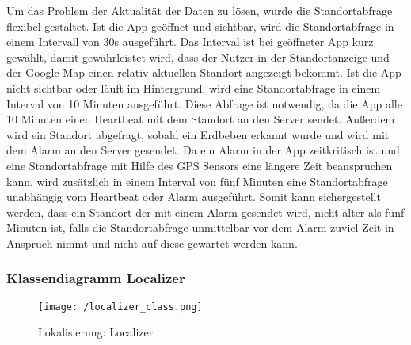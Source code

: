 \par\bigskip
Um das Problem der Aktualität der Daten zu lösen, wurde die Standortabfrage flexibel gestaltet. Ist die App geöffnet und sichtbar, wird die Standortabfrage in einem Intervall von 30s ausgeführt. Das Interval ist bei geöffneter App kurz gewählt, damit gewährleistet wird, dass der Nutzer in der Standortanzeige und der Google Map einen relativ aktuellen Standort angezeigt bekommt. Ist die App nicht sichtbar oder läuft im Hintergrund, wird eine Standortabfrage in einem Interval von 10 Minuten ausgeführt. Diese Abfrage ist notwendig, da die App  alle 10 Minuten einen Heartbeat mit dem Standort an den Server sendet. Außerdem wird ein Standort abgefragt, sobald ein Erdbeben erkannt wurde und wird mit dem Alarm an den Server gesendet. Da ein Alarm in der App zeitkritisch ist und eine Standortabfrage mit Hilfe des GPS Sensors eine längere Zeit beanspruchen kann, wird zusätzlich in einem Interval von fünf Minuten eine Standortabfrage unabhängig vom Heartbeat oder Alarm ausgeführt. Somit kann sichergestellt werden, dass ein Standort der mit einem Alarm gesendet wird, nicht älter als fünf Minuten ist, falls die Standortabfrage unmittelbar vor dem Alarm zuviel Zeit in Anspruch nimmt und nicht auf diese gewartet werden kann.

\subsubsection{Klassendiagramm Localizer}
\begin{figure}[H]
	\centering
	\texttt{[image: /localizer\_class.png]}
	\caption{Lokalisierung: Localizer}
	\label{fig:localizerClass}
\end{figure}